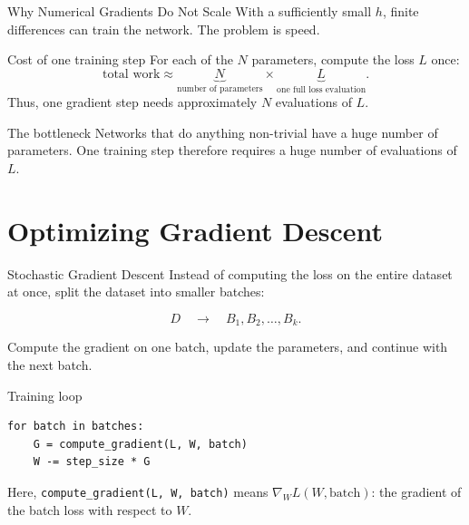 \documentclass[aspectratio=169]{beamer}
\begin{document}
\begin{frame}{Why Numerical Gradients Do Not Scale}
  With a sufficiently small $h$, finite differences can train the network.
  The problem is speed.

  \begin{block}{Cost of one training step}
    For each of the $N$ parameters, compute the loss $L$ once:
    \begin{equation*}
      \text{total work}
      \approx
      \underbrace{N}_{\text{number of parameters}}
      \times
      \underbrace{L}_{\text{one full loss evaluation}}.
    \end{equation*}
    Thus, one gradient step needs approximately $N$ evaluations of $L$.
  \end{block}

  \begin{alertblock}{The bottleneck}
    Networks that do anything non-trivial have a huge number of parameters.
    One training step therefore requires a huge number of evaluations of $L$.
  \end{alertblock}
\end{frame}

\section{Optimizing Gradient Descent}

\begin{frame}[fragile]{Stochastic Gradient Descent}
  Instead of computing the loss on the entire dataset at once, split the
  dataset into smaller batches:

  \begin{equation*}
    D \quad\longrightarrow\quad B_1, B_2, \ldots, B_k.
  \end{equation*}

  Compute the gradient on one batch, update the parameters, and continue with
  the next batch.

  \begin{block}{Training loop}
\begin{verbatim}
for batch in batches:
    G = compute_gradient(L, W, batch)
    W -= step_size * G
\end{verbatim}
  \end{block}

  Here, \texttt{compute\_gradient(L, W, batch)} means
  $\nabla_W L(W, \text{batch})$: the gradient of the batch loss with respect
  to $W$.
\end{frame}
\end{document}

